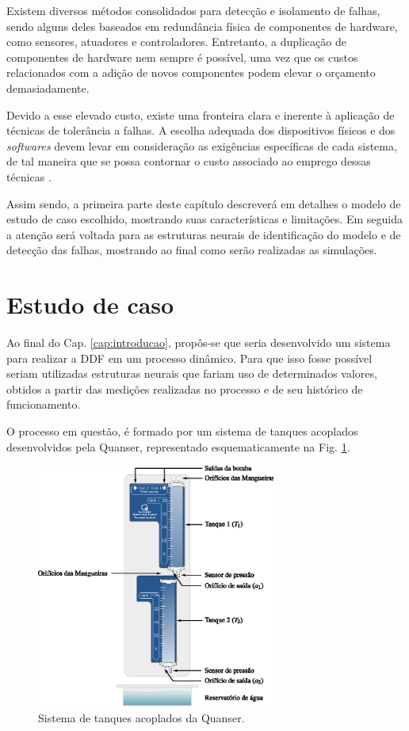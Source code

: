 \label{cap:sistema}
Existem diversos métodos consolidados para detecção e isolamento de falhas,
sendo alguns deles baseados em redundância física de componentes de hardware,
como sensores, atuadores e controladores. Entretanto, a duplicação de
componentes de hardware nem sempre é possível, uma vez que os custos
relacionados com a adição de novos componentes podem elevar o orçamento
demasiadamente.

Devido a esse elevado custo, existe uma fronteira clara e inerente à aplicação
de técnicas de tolerância a falhas. A escolha adequada dos dispositivos físicos
e dos {\it softwares} devem levar em consideração as exigências específicas de
cada sistema, de tal maneira que se possa contornar o custo associado ao emprego
dessas técnicas \cite{weber:2002}.

Assim sendo, a primeira parte deste capítulo descreverá em detalhes o modelo de
estudo de caso escolhido, mostrando suas características e limitações.  Em
seguida a atenção será voltada para as estruturas neurais de identificação do
modelo e de detecção das falhas, mostrando ao final como serão realizadas as
simulações.

\section{Estudo de caso}
Ao final do Cap. \ref{cap:introducao}, propôs-se que seria desenvolvido um
sistema para realizar a DDF em um processo dinâmico. Para que isso fosse
possível seriam utilizadas estruturas neurais que fariam uso de determinados
valores, obtidos a partir das medições realizadas no processo e de seu histórico
de funcionamento.

O processo em questão, é formado por um sistema de tanques acoplados
desenvolvidos pela Quanser\reg, representado esquematicamente na Fig.
\ref{fig:tanques}.

\begin{figure}[htb]
\centering
    \includegraphics[width=0.7\textwidth]{imgs/sistema/eps/tanques}
    \caption{Sistema de tanques acoplados da Quanser\reg.}
    \label{fig:tanques}
\end{figure}

